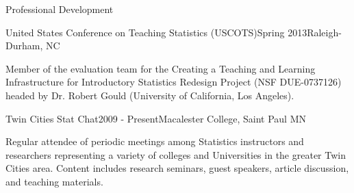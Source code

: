 \documentclass{resume} %
\begin{document}
\begin{rSection}{Professional Development}
	
	
	\begin{rSubsection}{United States Conference on Teaching Statistics (USCOTS)}{Spring 2013}{Raleigh-Durham, NC}{}
		\item[] Member of the evaluation team for the Creating a Teaching and Learning Infrastructure for Introductory Statistics Redesign Project (NSF DUE-0737126) headed by Dr. Robert Gould (University of California, Los Angeles). 
		
	\end{rSubsection}
	
	
	\begin{rSubsection}{Twin Cities Stat Chat}{2009 - Present}{Macalester College, Saint Paul MN}{}
		\item[] Regular attendee of periodic meetings among Statistics instructors and researchers representing a variety of colleges and Universities in the greater Twin Cities area.  Content includes research seminars, guest speakers, article discussion, and teaching materials.
		
		
	\end{rSubsection}
	

\end{rSection}
\end{document}
